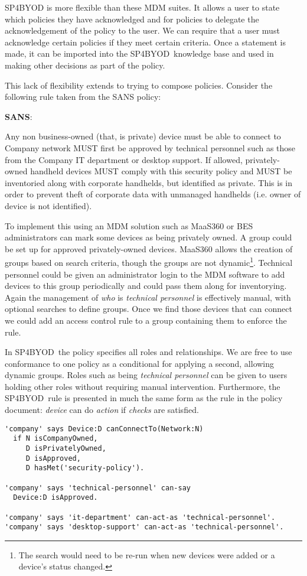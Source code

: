 \documentclass{llncs}
\newcommand{\AppPAL}[0]{SP4BYOD}
\newenvironment{policyrule}[1]{%
  \begin{mdframed}\footnotesize
      \noindent\textbf{\sffamily #1}:~\itshape%
}{%
  \end{mdframed}
}
\begin{document}
\AppPAL{} is more flexible than these MDM suites. 
It allows a user to state which policies they have acknowledged and for policies to delegate the acknowledgement of the policy to the user.
We can require that a user must acknowledge certain policies if they meet certain criteria.
Once a statement is made, it can be imported into the \AppPAL~knowledge base and used in making other decisions as part of the policy.

This lack of flexibility extends to trying to compose policies. 
Consider the following rule taken from the SANS policy:
\begin{policyrule}{SANS}
Any non business-owned (that, is private) device must be able to connect to Company network MUST first be approved by technical personnel such as those from the Company IT department or desktop support.
If allowed, privately-owned handheld devices MUST comply with this security policy and MUST be inventoried along with corporate handhelds, but identified as private. This is in order to prevent theft of corporate data with unmanaged handhelds (i.e. owner of device is not identified).
\end{policyrule}
To implement this using an MDM solution such as MaaS360 or \ac{BES} administrators can mark some devices as being privately owned.
A group could be set up for approved privately-owned devices.
MaaS360 allows the creation of groups based on search criteria, though the groups are not dynamic\footnote{The search would need to be re-run when new devices were added or a device's status changed.}.
Technical personnel could be given an administrator login to the MDM software to add devices to this group periodically and could pass them along for inventorying.
Again the management of \emph{who} is \emph{technical personnel} is effectively manual, with optional searches to define groups.
Once we find those devices that can connect we could add an access control rule to a group containing them to enforce the rule.

In \AppPAL~the policy specifies all roles and relationships.
We are free to use conformance to one policy as a conditional for applying a second, allowing dynamic groups.
Roles such as being \emph{technical personnel} can be given to users holding other roles without requiring manual intervention.
Furthermore, the \AppPAL~rule is presented in much the same form as the rule in the policy document: \emph{device} can do \emph{action} if \emph{checks} are satisfied.

\begin{lstlisting}
'company' says Device:D canConnectTo(Network:N)
  if N isCompanyOwned,
     D isPrivatelyOwned,
     D isApproved,
     D hasMet('security-policy').

'company' says 'technical-personnel' can-say
  Device:D isApproved.

'company' says 'it-department' can-act-as 'technical-personnel'.
'company' says 'desktop-support' can-act-as 'technical-personnel'.
\end{lstlisting}
\end{document}
